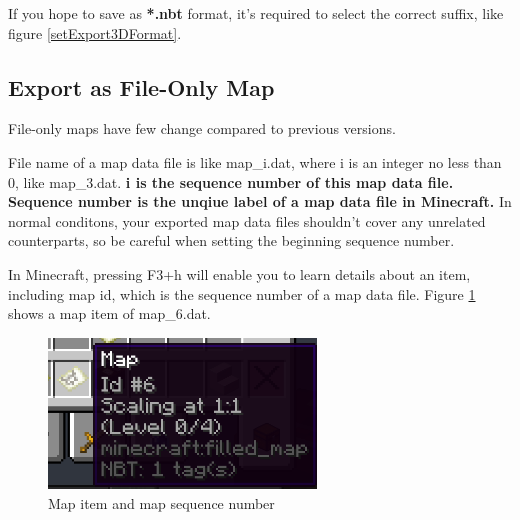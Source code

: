 \documentclass{article}
\begin{document}
    If you hope to save as \textbf{*.nbt} format, it's required to select the correct suffix, like figure \ref*{setExport3DFormat}.

    \subsection{Export as File-Only Map}
    File-only maps have few change compared to previous versions.

    File name of a map data file is like map\_i.dat, where i is an integer no less than 0, like map\_3.dat. \textbf{i is the sequence number of this map data file. Sequence number is the unqiue label of a map data file in Minecraft.} In normal conditons, your exported map data files shouldn't cover any unrelated counterparts, so be careful when setting the beginning sequence number.

    In Minecraft, pressing F3+h will enable you to learn details about an item, including map id, which is the sequence number of a map data file. Figure \ref*{mapItem} shows a map item of map\_6.dat.
   \begin{figure}[htbp]
       \centering
       \includegraphics[height=4cm]{Img8_MapItem.png}
       \caption{Map item and map sequence number}
       \label{mapItem}
   \end{figure}
\end{document}
